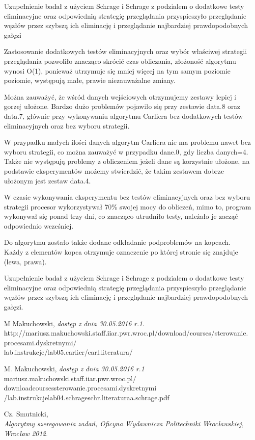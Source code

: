 \documentclass[11pt]{article}
\begin{document}
Uzupełnienie badał z użyciem Schrage i Schrage z podzialem o dodatkowe testy eliminacyjne
oraz odpowiednią strategię przeglądania przyspieszyło przeglądanie węzłów przez szybszą ich eliminację i przeglądanie najbardziej prawdopodobnych gałęzi

Zastosowanie dodatkowych testów eliminacyjnych oraz wybór właściwej strategii przeglądania pozwoliło znacząco skrócić czas obliczania, złożoność algorytmu wynosi O(1), ponieważ utrzymuje się mniej więcej na tym samym poziomie poziomie, występują małe, prawie niezauważalne zmiany.

Można zauważyć, że wśród danych wejściowych otrzymujemy zestawy lepiej i gorzej ułożone. Bardzo dużo problemów pojawiło się przy zestawie data.8 oraz data.7, głównie  przy wykonywaniu algorytmu Carliera bez dodatkowych testów eliminacyjnych oraz bez wyboru strategii.

W przypadku małych ilości danych algorytm Carliera nie ma problemu nawet bez wyboru strategii, co można zauważyć w przypadku dane.0, gdy liczba danych=4. Także nie występują problemy z obliczeniem jeżeli dane są korzystnie ułożone, na podstawie eksperymentów możemy stwierdzić, że takim zestawem dobrze ułożonym jest zestaw data.4.

W czasie wykonywania eksperymentu bez testów eliminacyjnych oraz bez wyboru strategii procesor wykorzystywał 70\% swojej mocy do obliczeń, mimo to, program wykonywał się  ponad trzy dni, co znacząco utrudniło testy, należało je zacząć odpowiednio wcześniej.

Do algorytmu zostało także dodane odkładanie podproblemów na kopcach. Każdy z elementów kopca otrzymuje oznaczenie po której stronie się znajduje (lewa, prawa).

Uzupełnienie badał z użyciem Schrage i Schrage z podzialem o dodatkowe testy eliminacyjne
oraz odpowiednią strategię przeglądania przyspieszyło przeglądanie węzłów przez szybszą ich eliminację i przeglądanie najbardziej prawdopodobnych gałęzi.


\begin{thebibliography}{9}
M Makuchowski,
\textit{dostęp z dnia 30.05.2016 r.1}. \\
http://mariusz.makuchowski.staff.iiar.pwr.wroc.pl/download/courses/sterowanie.procesami.dyskretnymi/\\lab.instrukcje/lab05.carlier/carl.literatura/%

M. Makuchowski,
\textit{dostęp z dnia 30.05.2016 r.1}
mariusz.makuchowski.staff.iiar.pwr.wroc.pl/
downloadcoursessterowanie.procesami.dyskretnymi
/lab.instrukcjelab04.schrageschr.literaturaa.schrage.pdf
 
Cz. Smutnicki,\\
\textit{Algorytmy szeregowania zadań, Oficyna Wydawnicza Politechniki Wrocławskiej, Wrocław 2012}. 
 
\end{thebibliography}
\end{document}
